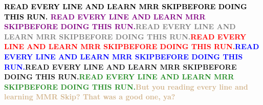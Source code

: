 \vspace*{\fill}
\begin{center}{\Huge \textbf{\textcolor{black}{READ EVERY LINE AND LEARN MRR SKIP\newline BEFORE DOING THIS RUN.} \newline\textcolor{purple}{READ EVERY LINE AND LEARN MRR SKIP\newline BEFORE DOING THIS RUN.}\newline\textcolor{gray}{READ EVERY LINE AND LEARN MRR SKIP\newline BEFORE DOING THIS RUN.}\newline\textcolor{red}{READ EVERY LINE AND LEARN MRR SKIP\newline BEFORE DOING THIS RUN.}\newline\textcolor{blue}{READ EVERY LINE AND LEARN MRR SKIP\newline BEFORE DOING THIS RUN.}\newline\textcolor{BurntOrange}{READ EVERY LINE AND LEARN MRR SKIP\newline BEFORE DOING THIS RUN.}\newline\textcolor{ForestGreen}{READ EVERY LINE AND LEARN MRR SKIP\newline BEFORE DOING THIS RUN.}\newline\textcolor{Tan}{But you reading every line and learning MMR Skip? That was a good one, ya?}} }\end{center}
\vspace*{\fill}
\newpage